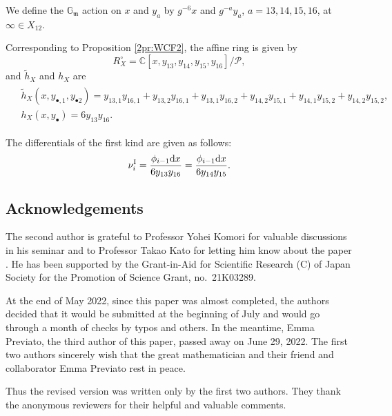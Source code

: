 \documentclass[10pt,a4paper]{amsart}
\def\CC{{\mathbb C}}
\def\GG{{\mathbb G}}
\def\cP{{\mathcal P}}
\def\fm{{\mathfrak m}}
\def\th{{\widetilde h}}
\def\nuI#1{{\nu^{\mathrm{I}}_{#1}}}
\numberwithin{equation}{section}
\begin{document}
We define the $\GG_\fm$ action on $x$ and $y_a$ by $g^{-6} x$ and $g^{-a} y_a$, $a = 13, 14, 15, 16$, at $\infty \in X_{12}$.

Corresponding to Proposition \ref{2pr:WCF2}, the affine ring is given by
\[
R_{X}^\circ =\CC[x, y_{13}, y_{14}, y_{15}, y_{16}]/ \cP,
\]
and $\th_X$ and $h_X$ are
\begin{gather*}
\begin{split}
&\th_X(x, y_{\bullet,1}, y_{\bullet 2}) =
 y_{13,1} y_{16,1}
+ y_{13,2} y_{16,1}
+ y_{13,1} y_{16,2}
+ y_{14,2} y_{15,1}
+ y_{14,1} y_{15,2}
+ y_{14,2} y_{15,2},\\
&h_X(x, y_\bullet) = 6 y_{13} y_{16}.
\end{split}
\end{gather*}

The differentials of the first kind are given as follows:
\[
\nuI{i}=\frac{\phi_{i-1} {\rm d} x}{6 y_{13}y_{16}}=\frac{\phi_{i-1} {\rm d} x}{6 y_{14}y_{15}}.
\]

\subsection*{Acknowledgements}

The second author is grateful to Professor Yohei Komori for valuable discussions in his seminar and to Professor Takao Kato for letting him know about the paper \cite{CoppensKato}.
He has been supported by the Grant-in-Aid for Scientific Research (C) of Japan Society for the Promotion of Science Grant, no.~21K03289.

At the end of May 2022, since this paper was almost completed, the authors decided that it would be submitted at the beginning of July and would go through a month of checks by typos and others.
In the meantime, Emma Previato, the third author of this paper, passed away on June 29, 2022.
The first two authors sincerely wish that the great mathematician and their friend and collaborator Emma Previato rest in peace.

Thus the revised version was written only by the first two authors.
They thank the anonymous reviewers for their helpful and valuable comments.

\end{document}
